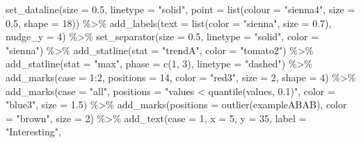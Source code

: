 \documentclass[
  letterpaper,
  DIV=11,
  numbers=noendperiod]{scrreprt}
\newenvironment{Shaded}{\begin{snugshade}}{\end{snugshade}}
\newcommand{\AttributeTok}[1]{\textcolor[rgb]{0.40,0.45,0.13}{#1}}
\newcommand{\DecValTok}[1]{\textcolor[rgb]{0.68,0.00,0.00}{#1}}
\newcommand{\FloatTok}[1]{\textcolor[rgb]{0.68,0.00,0.00}{#1}}
\newcommand{\FunctionTok}[1]{\textcolor[rgb]{0.28,0.35,0.67}{#1}}
\newcommand{\NormalTok}[1]{\textcolor[rgb]{0.00,0.23,0.31}{#1}}
\newcommand{\SpecialCharTok}[1]{\textcolor[rgb]{0.37,0.37,0.37}{#1}}
\newcommand{\StringTok}[1]{\textcolor[rgb]{0.13,0.47,0.30}{#1}}
\begin{document}
\begin{Shaded}
\begin{Highlighting}[]
  \FunctionTok{set\_dataline}\NormalTok{(}\AttributeTok{size =} \FloatTok{0.5}\NormalTok{, }\AttributeTok{linetype =} \StringTok{"solid"}\NormalTok{, }
               \AttributeTok{point =} \FunctionTok{list}\NormalTok{(}\AttributeTok{colour =} \StringTok{"sienna4"}\NormalTok{, }\AttributeTok{size =} \FloatTok{0.5}\NormalTok{, }\AttributeTok{shape =} \DecValTok{18}\NormalTok{)) }\SpecialCharTok{\%\textgreater{}\%}
  \FunctionTok{add\_labels}\NormalTok{(}\AttributeTok{text =} \FunctionTok{list}\NormalTok{(}\AttributeTok{color =} \StringTok{"sienna"}\NormalTok{, }\AttributeTok{size =} \FloatTok{0.7}\NormalTok{), }\AttributeTok{nudge\_y =} \DecValTok{4}\NormalTok{) }\SpecialCharTok{\%\textgreater{}\%}
  \FunctionTok{set\_separator}\NormalTok{(}\AttributeTok{size =} \FloatTok{0.5}\NormalTok{, }\AttributeTok{linetype =} \StringTok{"solid"}\NormalTok{, }\AttributeTok{color =} \StringTok{"sienna"}\NormalTok{) }\SpecialCharTok{\%\textgreater{}\%}
  \FunctionTok{add\_statline}\NormalTok{(}\AttributeTok{stat =} \StringTok{"trendA"}\NormalTok{, }\AttributeTok{color =} \StringTok{"tomato2"}\NormalTok{) }\SpecialCharTok{\%\textgreater{}\%}
  \FunctionTok{add\_statline}\NormalTok{(}\AttributeTok{stat =} \StringTok{"max"}\NormalTok{, }\AttributeTok{phase =} \FunctionTok{c}\NormalTok{(}\DecValTok{1}\NormalTok{, }\DecValTok{3}\NormalTok{), }\AttributeTok{linetype =} \StringTok{"dashed"}\NormalTok{) }\SpecialCharTok{\%\textgreater{}\%}
  \FunctionTok{add\_marks}\NormalTok{(}\AttributeTok{case =} \DecValTok{1}\SpecialCharTok{:}\DecValTok{2}\NormalTok{, }\AttributeTok{positions =} \DecValTok{14}\NormalTok{, }\AttributeTok{color =} \StringTok{"red3"}\NormalTok{, }\AttributeTok{size =} \DecValTok{2}\NormalTok{, }\AttributeTok{shape =} \DecValTok{4}\NormalTok{) }\SpecialCharTok{\%\textgreater{}\%}
  \FunctionTok{add\_marks}\NormalTok{(}\AttributeTok{case =} \StringTok{"all"}\NormalTok{, }\AttributeTok{positions =} \StringTok{"values \textless{} quantile(values, 0.1)"}\NormalTok{, }
            \AttributeTok{color =} \StringTok{"blue3"}\NormalTok{, }\AttributeTok{size =} \FloatTok{1.5}\NormalTok{) }\SpecialCharTok{\%\textgreater{}\%}
  \FunctionTok{add\_marks}\NormalTok{(}\AttributeTok{positions =} \FunctionTok{outlier}\NormalTok{(exampleABAB), }\AttributeTok{color =} \StringTok{"brown"}\NormalTok{, }\AttributeTok{size =} \DecValTok{2}\NormalTok{) }\SpecialCharTok{\%\textgreater{}\%}
  \FunctionTok{add\_text}\NormalTok{(}\AttributeTok{case =} \DecValTok{1}\NormalTok{, }\AttributeTok{x =} \DecValTok{5}\NormalTok{, }\AttributeTok{y =} \DecValTok{35}\NormalTok{, }\AttributeTok{label =} \StringTok{"Interesting"}\NormalTok{, }

\end{Highlighting}
\end{Shaded}
\end{document}
